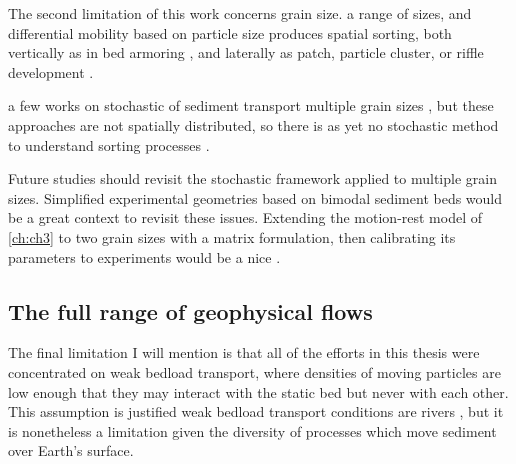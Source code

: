 The second \DIFdelbegin {}\DIFdelend limitation of this work concerns grain size.
\DIFdelbegin {}\DIFdelend \DIFaddbegin {}\DIFaddend a range of sizes, and differential mobility based on particle size produces spatial sorting, both vertically as in bed armoring \citep{Parker1982,Wilcock1989,Aberle2006}, and laterally as patch, particle cluster, or riffle development \citep{Nelson2014,Venditti2017}.

\DIFdelbegin {}\DIFdelend \DIFaddbegin {}\DIFaddend a few works on stochastic \DIFdelbegin {}\DIFdelend \DIFaddbegin {}\DIFaddend of sediment transport \DIFdelbegin {}\DIFdelend \DIFaddbegin {}\DIFaddend multiple grain sizes \citep{Sun2000,Parker2000}, but these approaches are not spatially distributed, so there is as yet no stochastic method to understand sorting processes \DIFaddbegin {}\DIFaddend .

Future studies should revisit the stochastic framework applied to multiple grain sizes. Simplified experimental geometries based on bimodal sediment beds \citep[e.g.][]{Houssais2012} would be a great context to revisit these issues. Extending the motion-rest model of \DIFdelbegin {}\DIFdelend \DIFaddbegin {}\DIFaddend \ref{ch:ch3} to two grain sizes with a matrix formulation, then calibrating its parameters to experiments would be a nice \DIFdelbegin {}\DIFdelend \DIFaddbegin {}\DIFaddend .

\subsection{The full range of geophysical flows}

The final limitation I will mention is that all of the efforts in this thesis were concentrated on weak bedload transport, where densities of moving particles are low enough that they may interact with the static bed but never with each other. This assumption is justified \DIFdelbegin {}\DIFdelend \DIFaddbegin {}\DIFaddend weak bedload transport conditions are \DIFdelbegin {}\DIFdelend \DIFaddbegin {}\DIFaddend rivers \citep{Ashworth1989,Warburton1992}, but it is nonetheless a limitation given the diversity of processes which move sediment over Earth's surface.

